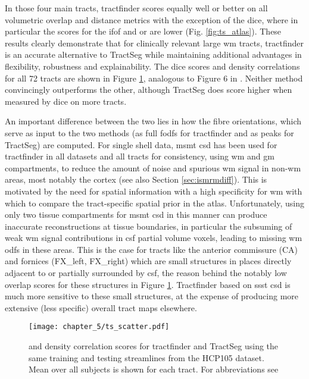 \documentclass[12pt,phd,a4paper,twoside]{ucl_thesis}
\renewcommand{\textcite}[2][]{
\ifthenelse { \equal {#1} {} }  {\citeauthor{#2}\autocite{#2}}   {\citeauthor{#1}\autocite{#2}}}
\begin{document}
In those four main tracts, tractfinder scores equally well or better on all volumetric overlap and distance metrics with the exception of the \gls{dice}, where in particular the scores for the \gls{ifof} and \gls{or} are lower (Fig. \ref{fig:ts_atlas}).
These results clearly demonstrate that for clinically relevant large \gls{wm} tracts, tractfinder is an accurate alternative to TractSeg while maintaining additional advantages in flexibility, robustness and explainability.
The \gls{dice} scores and density correlations for all 72 tracts are shown in Figure \ref{fig:ts_all_tracts}, analogous to Figure 6 in \textcite{Wasserthal2018}.
Neither method convincingly outperforms the other, although TractSeg does score higher when measured by \gls{dice} on more tracts.

An important difference between the two lies in how the fibre orientations, which serve as input to the two methods (as full \glspl{fodf} for tractfinder and as peaks for TractSeg) are computed.
For single shell data, \gls{msmt} \gls{csd} has been used for tractfinder in all datasets and all tracts for consistency, using \gls{wm} and \gls{gm} compartments, to reduce the amount of noise and spurious \gls{wm} signal in non-\gls{wm} areas, most notably the cortex (see also Section \ref{sec:ismrmdiff}).
This is motivated by the need for spatial information with a high specificity for \gls{wm} with which to compare the tract-specific spatial prior in the atlas.
Unfortunately, using only two tissue compartments for \gls{msmt} \gls{csd} in this manner can produce inaccurate reconstructions at tissue boundaries, in particular the subsuming of weak \gls{wm} signal contributions in \gls{csf} partial volume voxels, leading to missing \gls{wm} \glspl{odf} in these areas.
This is the case for tracts like the anterior commissure (CA) and fornices (FX\_left, FX\_right) which are small structures in places directly adjacent to or partially surrounded by \gls{csf}, the reason behind the notably low overlap scores for these structures in Figure \ref{fig:ts_all_tracts}.
Tractfinder based on \gls{ssst} \gls{csd} is much more sensitive to these small structures, at the expense of producing more extensive (less specific) overall tract maps elsewhere.

\begin{figure}[h!]
  \texttt{[image: chapter\_5/ts\_scatter.pdf]}
  \caption[Direct comparison between tractfinder and TractSeg, in all tracts]{ and density correlation scores for tractfinder and TractSeg using the same training and testing streamlines from the HCP105 dataset. Mean over all subjects is shown for each tract. For abbreviations see \textcite{Wasserthal2018}}
  \label{fig:ts_all_tracts}
\end{figure}
\end{document}
